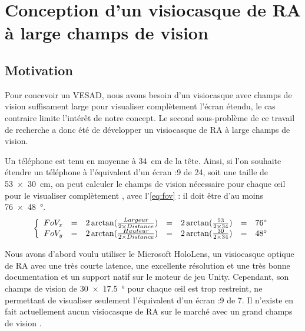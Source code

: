 \chapter{Conception d'un visiocasque de RA à large champs de vision}
\label{ch:methodology}

\section{Motivation}
Pour concevoir un VESAD, nous avons besoin d'un visiocasque avec champs de vision suffisament large pour visualiser complètement l'écran étendu, le cas contraire limite l'intérêt de notre concept. Le second sous-problème de ce travail de recherche a donc été de développer un visiocasque de RA à large champs de vision.

Un téléphone est tenu en moyenne à \SI{34}{\cm} \citep{Bababekova2011} de la tête. Ainsi, si l'on souhaite étendre un téléphone à l'équivalent d'un écran {:9} de \SI{24}{\inch}, soit une taille de \SI{53x30}{\cm}, on peut calculer le champs de vision nécessaire pour chaque \oe il pour le visualiser complètement , avec l'\autoref{eq:fov} : il doit être d'au moins \SI{76x48}{\degree}.
\begin{equation}
  \label{eq:fov}
  \left \{
  \begin{array}{r c c c c c l}
    FoV_x & = & 2 \arctan (\frac{Largeur}{2 \times Distance}) & = & 2 \arctan (\frac{53}{2 \times 34}) & = & \ang{76}\\
    FoV_y & = & 2 \arctan (\frac{Hauteur}{2 \times Distance}) & = & 2 \arctan (\frac{30}{2 \times 34}) & = & \ang{48}
  \end{array}
  \right .
\end{equation}


Nous avons d'abord voulu utiliser le Microsoft HoloLens, un visiocasque optique de RA avec une très courte latence, une excellente résolution et une très bonne documentation et un support natif sur le moteur de jeu Unity. Cependant, son champs de vision de \SI{30x17.5}{\degree} pour chaque \oe il \citep{Kreylos2015} est trop restreint, ne permettant de visualiser seulement l'équivalent d'un écran {:9} de \SI{7}{\inch}. Il n'existe en fait actuellement aucun visiocasque de RA sur le marché avec un grand champs de vision \citep{Millette2016}.


